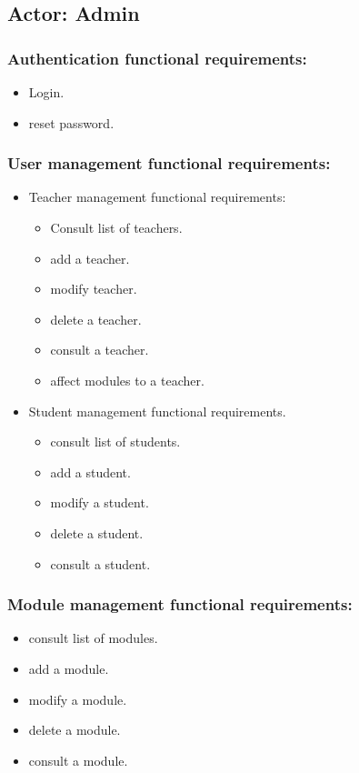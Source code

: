 \documentclass[a4paper,12p]{article}
\begin{document}
     \subsection{Actor: Admin}
     \subsubsection{Authentication functional requirements:}
     \begin{itemize}
         \item Login.
         \item reset password.
     \end{itemize}

     \subsubsection{User management functional requirements:}
     \begin{itemize}

         \item Teacher management functional requirements:
         \begin{itemize}
             \item Consult list of teachers.
             \item add a teacher.
             \item modify teacher.
             \item delete a teacher.
             \item consult a teacher.
             \item affect modules to a teacher.
         \end{itemize}

         \item Student management functional requirements.
         \begin{itemize}
             \item consult list of students.
             \item add a student.
             \item modify a student.
             \item delete a student.
             \item consult a student.
         \end{itemize}

     \end{itemize}

     \subsubsection{Module management functional requirements:}
     \begin{itemize}
        \item consult list of modules.
        \item add a module.
        \item modify a module.
        \item delete a module.
        \item consult a module.
     \end{itemize}
\end{document}
